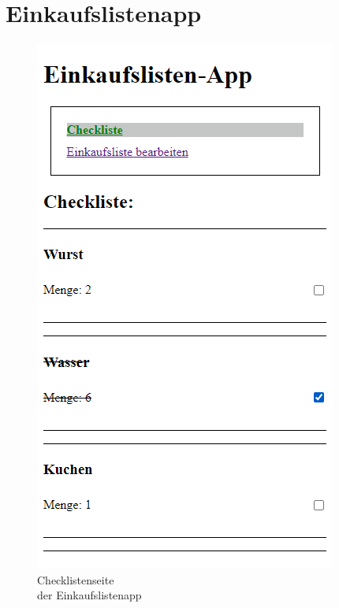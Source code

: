 \section*{Einkaufslistenapp}
\begin{figure}[h]
    \begin{minipage}[H]{.45\textwidth}
        \includegraphics[width=\textwidth]{img/vue-Einkaufsliste-Checkliste}
        \caption{Checklistenseite\\ der Einkaufslistenapp}

\end{minipage}
\end{figure}

